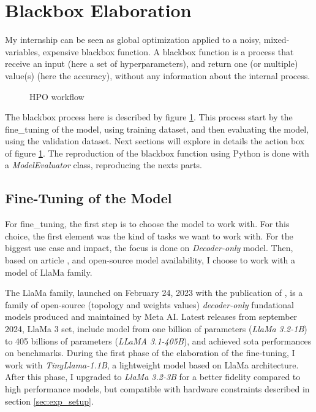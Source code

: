 \section{Blackbox Elaboration}
\label{sec:blackbox}
My internship can be seen as global optimization applied to a noisy, mixed-variables, expensive blackbox function. A blackbox function is a process that receive an input (here a set of hyperparameters), and return one (or multiple) value(s) (here the accuracy), without any information about the internal process. 


\begin{figure}[h]
    \centering
    
    \caption{HPO workflow}
    \label{fig:hpo_workflow}
\end{figure}

The blackbox process here is described by figure \ref{fig:hpo_workflow}. This process start by the \gls{fine_tuning} of the model, using training dataset, and then evaluating the model, using the validation dataset. Next sections will explore in details the action box of figure \ref{fig:hpo_workflow}. The reproduction of the blackbox function using Python is done with a \textit{ModelEvaluator} class, reproducing the nexts parts.


\subsection{Fine-Tuning of the Model}
\label{sec:fine_tuning}

For \gls{fine_tuning}, the first step is to choose the model to work with. For this choice, the first element was the kind of tasks we want to work with. For the biggest use case and impact, the focus is done on \textit{Decoder-only} model. Then, based on article \cite{tribes_hyperparameter_2024}, and open-source model availability, I choose to work with a model of LlaMa family.

The LlaMa family, launched on February 24, 2023 with the publication of \cite{touvron_llama_2023}, is a family of open-source (topology and weights values) \textit{decoder-only} fundational models produced and maintained by Meta AI. Latest releases from september 2024, LlaMa 3\cite{grattafiori_llama_2024} set, include model from one billion of parameters (\textit{LlaMa 3.2-1B}) to 405 billions of parameters (\textit{LLaMA 3.1-405B}), and achieved \acrlong{sota} performances on benchmarks. During the first phase of the elaboration of the fine-tuning, I work with \textit{TinyLlama-1.1B}, a lightweight model based on LlaMa architecture. After this phase, I upgraded to \textit{LlaMa 3.2-3B} for a better fidelity compared to high performance models, but compatible with hardware constraints described in section \ref{sec:exp_setup}.

